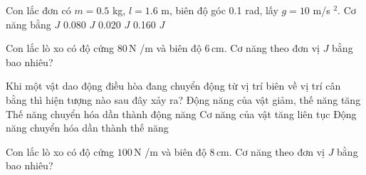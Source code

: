 \begin{ex}
Con lắc đơn có $m=0.5$ kg, $l=1.6$ m, biên độ góc 0.1 rad, lấy $g=10$ m/s $^2$. Cơ năng bằng
\choice
{ $J$}
{0.080 $J$}
{0.020 $J$}
{0.160 $J$}
\end{ex}


\begin{ex}
Con lắc lò xo có độ cứng $80\,\text{N}$ /m và biên độ $6\,\text{cm}$. Cơ năng theo đơn vị $J$ bằng bao nhiêu?
\end{ex}

\begin{ex}
Khi một vật dao động điều hòa đang chuyển động từ vị trí biên về vị trí cân bằng thì hiện tượng nào sau đây xảy ra?
\choice
{Động năng của vật giảm, thế năng tăng}
{\True Thế năng chuyển hóa dần thành động năng}
{Cơ năng của vật tăng liên tục}
{Động năng chuyển hóa dần thành thế năng}
\end{ex}

\begin{ex}
Con lắc lò xo có độ cứng $100\,\text{N}$ /m và biên độ $8\,\text{cm}$. Cơ năng theo đơn vị $J$ bằng bao nhiêu?
\end{ex}


